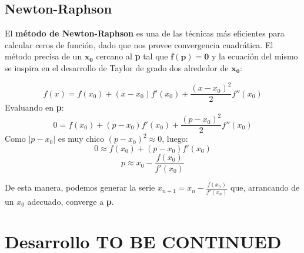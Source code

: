 \documentclass[a4paper]{article}
\begin{document}
\subsection{Newton-Raphson}
El \textbf{método de Newton-Raphson} es una de las técnicas más eficientes para calcular ceros de función,
dado que nos provee convergencia cuadrática. El método precisa de un $\mathbf{x_0}$ cercano 
al \textbf{p} tal que $\mathbf{f(p) = 0}$ y la ecuación del mismo se inspira en el desarrollo de
Taylor de grado dos alrededor de $\mathbf{x_0}$:

$$f(x) = f(x_0) + (x - x_0)f'(x_0) + \frac{(x - x_0)^2}{2}f''(x_0)$$
Evaluando en \textbf{p}:
$$0 = f(x_0) + (p - x_0)f'(x_0) + \frac{(p - x_0)^2}{2}f''(x_0)$$
Como  $|p - x_0|$ es muy chico $(p - x_0)^2 \approx 0$, luego:  
$$0 \approx f(x_0) + (p - x_0)f'(x_0)$$
$$p \approx x_0 - \frac{f(x_0)}{f'(x_0)}$$

De esta manera, podemos generar la serie $x_{n + 1} = x_n - \frac{f(x_n)}{f'(x_n)}$ que, arrancando de un $x_0$ adecuado, converge a \textbf{p}.


\section{Desarrollo TO BE CONTINUED}
\end{document}
